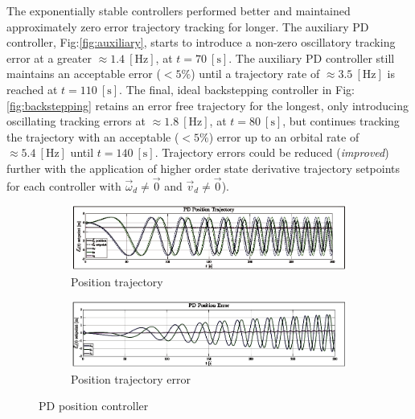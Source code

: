 The exponentially stable controllers performed better and maintained approximately zero error trajectory tracking for longer. The auxiliary PD controller, Fig:\ref{fig:auxiliary}, starts to introduce a non-zero oscillatory tracking error at a greater $\approx 1.4~[\text{Hz}]$, at $t=70~[\text{s}]$. The auxiliary PD controller still maintains an acceptable error ($<5\%$) until a trajectory rate of $\approx 3.5~[\text{Hz}]$ is reached at $t=110~[\text{s}]$. The final, ideal backstepping controller in Fig:\ref{fig:backstepping} retains an error free trajectory for the longest, only introducing oscillating tracking errors at $\approx 1.8~[\text{Hz}]$, at $t=80~[\text{s}]$, but continues tracking the trajectory with an acceptable ($<5\%$) error up to an orbital rate of $\approx 5.4~[\text{Hz}]$ until $t=140~[\text{s}]$. Trajectory errors could be reduced (\emph{improved}) further with the application of higher order state derivative trajectory setpoints for each controller with $\vec{\omega}_d\not=\vec{0}$ and $\vec{v}_d\not=\vec{0}$).
\newpage
\begin{figure}[htbp]
\centering
\vspace{-8pt}
\begin{subfigure}{0.9\textwidth}
\centering
\includegraphics[width=\textwidth]{graphs/PD_Position_Trajectory}
\vspace{-18pt}
\caption{Position trajectory}
\label{fig:pd_position_trajectory}
\end{subfigure}
\begin{subfigure}{0.9\textwidth}
\centering
\includegraphics[width=\textwidth]{graphs/PD_Position_Error}
\vspace{-18pt}
\caption{Position trajectory error}
\label{fig:pd_position_error}
\end{subfigure}
\vspace{-10pt}
\caption{PD position controller}
\label{fig:pd_position}
\end{figure}
